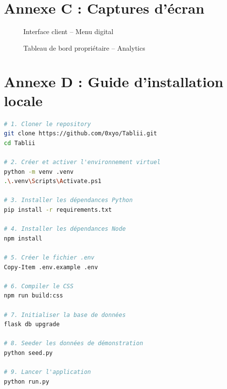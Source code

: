 \documentclass[12pt,a4paper]{report}
\begin{document}
\section{Annexe C : Captures d'écran}

\begin{figure}[H]
    \centering
    \caption{Interface client -- Menu digital}
    \label{fig:customer-menu}
\end{figure}

\begin{figure}[H]
    \centering
    \caption{Tableau de bord propriétaire -- Analytics}
    \label{fig:dashboard}
\end{figure}

\section{Annexe D : Guide d'installation locale}

\begin{codebox}
\begin{lstlisting}[language=bash]
# 1. Cloner le repository
git clone https://github.com/0xyo/Tablii.git
cd Tablii

# 2. Créer et activer l'environnement virtuel
python -m venv .venv
.\.venv\Scripts\Activate.ps1

# 3. Installer les dépendances Python
pip install -r requirements.txt

# 4. Installer les dépendances Node
npm install

# 5. Créer le fichier .env
Copy-Item .env.example .env

# 6. Compiler le CSS
npm run build:css

# 7. Initialiser la base de données
flask db upgrade

# 8. Seeder les données de démonstration
python seed.py

# 9. Lancer l'application
python run.py
\end{lstlisting}
\end{codebox}
\end{document}

